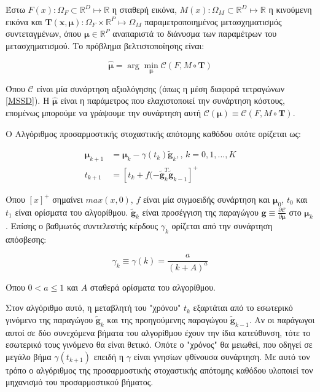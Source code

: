 \documentclass[a4paper,12pt]{article}
\newcommand{\argminUnder}{\arg\!\min}
\newcommand{\R}{\mathbb{R}}
\begin{document}
Έστω $F(x): \Omega_F \subset \R^D \mapsto \R$ η σταθερή εικόνα, $M(x): \Omega_M
\subset \R^D \mapsto \R$ η κινούμενη εικόνα και $\bm{T(x,\mu)}: \Omega_F \times
\R^P \mapsto \Omega_M$ παραμετροποιημένος μετασχηματισμός συντεταγμένων, όπου
$\bm{\mu} \in \R^P$ αναπαριστά το διάνυσμα των παραμέτρων του μετασχηματισμού.
Το πρόβλημα βελτιστοποίησης είναι:


\begin{equation*}
    \hat{\bm{\mu}} = \argminUnder_{\bm{\mu}} \mathcal{C} (F,M\circ \bm{T})
\end{equation*}

Όπου $\mathcal{C}$ είναι μία συνάρτηση αξιολόγησης (όπως η μέση διαφορά
τετραγώνων \ref{MSSD}). Η $\hat{\bm{\mu}}$ είναι η παράμετρος που ελαχιστοποιεί
την συνάρτηση κόστους, επομένως μπορούμε να γράψουμε την συνάρτηση αυτή
$\mathcal{C} (\bm{\mu}) \equiv \mathcal{C} (F,M\circ \bm{T})$.

Ο Αλγόριθμος προσαρμοστικής στοχαστικής απότομης καθόδου οπότε ορίζεται ως:

\begin{equation*}
\begin{split}
    \bm{\mu}_{k+1} &= \bm{\mu}_{k} - \gamma(t_k) \widetilde{\bm{g}}_{k},
    \text{,  }
    k=0,1,...,K
    \\
    t_{k+1} &= [t_k + f(-\widetilde{\bm{g}}_{k}^T \widetilde{\bm{g}}_{k-1}]^+
\end{split}
\end{equation*}

Όπου $[x]^+$ σημαίνει $max(x,0)$, $f$ είναι μία σιγμοειδής συνάρτηση και
$\bm{\mu}_{0}$, $t_0$ και $t_1$ είναι ορίσματα του αλγορίθμου.
$\widetilde{\bm{g}}_{k}$ είναι προσέγγιση της παραγώγου $\bm{g} \equiv \frac
{\partial \mathcal{C}} {\partial \bm{\mu}}$ στο $\bm{\mu}_k$. Επίσης ο βαθμωτός
συντελεστής κέρδους $\gamma_k$ ορίζεται από την συνάρτηση απόσβεσης: 

\begin{equation*}
    \gamma_k \equiv \gamma(k) = \frac {a} {(k+A)^a}
\end{equation*}

Όπου $0 < a \leq 1$ και $A$ σταθερά ορίσματα του αλγορίθμου.

Στον αλγόριθμο αυτό, η μεταβλητή του "χρόνου" $t_k$ εξαρτάται από το εσωτερικό
γινόμενο της παραγώγου $\widetilde{\bm{g}}_{k}$ και της προηγούμενης παραγώγου
$\widetilde{\bm{g}}_{k-1}$. Αν οι παράγωγοι αυτοί σε δύο συνεχόμενα βήματα του
αλγορίθμου έχουν την ίδια κατεύθυνση, τότε  το εσωτερικό τους γινόμενο θα είναι
θετικό. Οπότε ο "χρόνος" θα μειωθεί, που οδηγεί σε μεγάλο βήμα
$\gamma(t_{k+1})$ επειδή η $\gamma$ είναι γνησίων φθίνουσα συνάρτηση. Με αυτό
τον τρόπο ο αλγόριθμος της προσαρμοστικής στοχαστικής απότομης καθόδου υλοποιεί
τον μηχανισμό του προσαρμοστικού βήματος.
\end{document}
